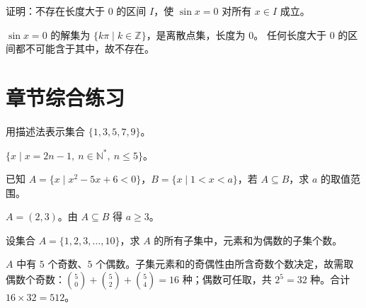 \begin{problem}
证明：不存在长度大于 $0$ 的区间 $I$，使 $\sin x=0$ 对所有 $x\in I$ 成立。
\end{problem}
\begin{solution}
$\sin x=0$ 的解集为 $\{k\pi\mid k\in\mathbb{Z}\}$，是离散点集，长度为 $0$。
任何长度大于 $0$ 的区间都不可能含于其中，故不存在。
\end{solution}

\section{章节综合练习}

\begin{problem}
用描述法表示集合 $\{1,3,5,7,9\}$。
\end{problem}
\begin{solution}
$\{x\mid x=2n-1,\ n\in\mathbb{N}^*,\ n\le 5\}$。
\end{solution}

\begin{problem}
已知 $A=\{x\mid x^2-5x+6<0\}$，$B=\{x\mid 1<x<a\}$，若 $A\subseteq B$，求 $a$ 的取值范围。
\end{problem}
\begin{solution}
$A=(2,3)$。由 $A\subseteq B$ 得 $a\ge 3$。
\end{solution}

\begin{problem}
设集合 $A=\{1,2,3,\dots,10\}$，求 $A$ 的所有子集中，元素和为偶数的子集个数。
\end{problem}
\begin{solution}
$A$ 中有 $5$ 个奇数、$5$ 个偶数。子集元素和的奇偶性由所含奇数个数决定，故需取偶数个奇数：$\binom{5}{0}+\binom{5}{2}+\binom{5}{4}=16$ 种；偶数可任取，共 $2^5=32$ 种。合计 $16\times 32=512$。
\end{solution}
